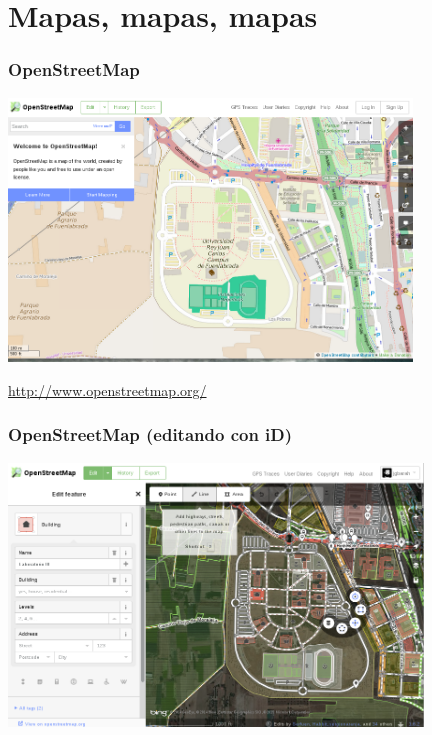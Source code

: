 %
%

\section{Mapas, mapas, mapas}

\begin{frame}
\frametitle{OpenStreetMap}

\begin{center}
\includegraphics[height=7cm]{figs/openstreetmap}
\end{center}

\begin{flushright}
  \url{http://www.openstreetmap.org/}
\end{flushright}
\end{frame}

\begin{frame}
\frametitle{OpenStreetMap (editando con iD)}

\begin{center}
\includegraphics[height=7cm]{figs/openstreetmap-id}
\end{center}

\end{frame}


